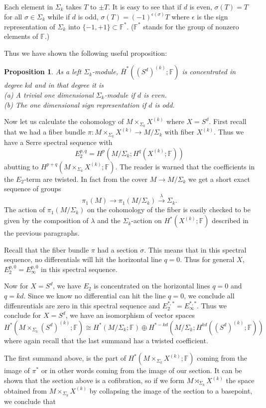 \documentclass{amsart}
\newtheorem{prop}[thm]{Proposition}
\newcommand{\FF}{\mathbb{F}}
\newcommand{\MsigX}{ M \times_{\Sigma_k} X^{(k)}}
\newcommand{\MtsigX}{ M \rtimes_{\Sigma_k} X^{(k)}}
\newcommand{\MsigSd}{ M \times_{\Sigma_k} (S^d)^{(k)}}
\begin{document}
Each element in $\Sigma_k$ takes $T$ to $ \pm T$. It is easy to 
see that if $d$ is even, $\sigma(T)=T$ for all $\sigma \in \Sigma_k$ 
while if $d$ is odd, $\sigma(T)=(-1)^{\epsilon(\sigma)}T$ 
where $\epsilon$ is the sign representation of $\Sigma_k$ into 
$\{-1,+1\} \subset \FF^*$. ($\FF^*$ stands for the group of nonzero 
elements of $\FF$.)

Thus we have shown the following useful proposition:

\begin{prop}
As a left $\Sigma_k$-module, 
$\bar{H}^*((S^d)^{(k)}; \FF)$ is concentrated in degree $kd$ and 
in that degree it is \\
(a) A trivial one dimensional $\Sigma_k$-module if $d$ is even. \\
(b) The one dimensional sign representation if $d$ is odd.  
\end{prop} 

Now let us calculate the cohomology of $\MsigX$ where $X=S^d$.
First recall that we had a fiber bundle 
$\pi: \MsigX \rightarrow M/\Sigma_k$ with fiber $X^{(k)}$. 
Thus we have a Serre spectral sequence with 
$$
E^{p,q}_2 = H^p(M/\Sigma_k; H^q(X^{(k)};\FF))
$$
abutting to $H^{p+q}(\MsigX; \FF)$.
The reader is warned that the coefficients in the $E_2$-term are twisted. 
In fact from the cover $M \rightarrow M/\Sigma_k$ we get a short exact 
sequence of groups 
$$
\pi_1(M) \rightarrow \pi_1(M/\Sigma_k) \overset{\lambda}{\rightarrow} 
\Sigma_k.
$$ 
The action of $\pi_1(M/\Sigma_k)$ on the cohomology of the fiber 
is easily checked to be given by 
the composition of $\lambda$ and the $\Sigma_k$-action on $H^*(X^{(k)}; \FF)$
described in the previous paragraphs.

Recall that the fiber bundle $\pi$ had a section $\sigma$. This means that in 
this spectral sequence, no differentials will hit the horizontal line 
$q=0$. Thus for general $X$, $E^{p,0}_2=E^{p,0}_{\infty}$ in this 
spectral sequence. 

Now for $X=S^d$, we have $E_2$ is concentrated on the horizontal lines 
$q=0$ and $q=kd$. Since we know no differential can hit the line $q=0$, 
we conclude all diffenrentials are zero in this spectral sequence 
and $E_2^{*,*}=E_{\infty}^{*,*}$. Thus we conclude for $X=S^d$, 
we have an isomorphism of vector spaces
$$
H^*(\MsigSd; \FF) \cong H^*(M/\Sigma_k; \FF) \oplus H^{*-kd}(M/\Sigma_k; 
H^{kd}((S^d)^{(k)}; \FF))
$$
where again recall that the last summand has a twisted coefficient.

The first summand above, is the part of $H^*(\MsigX; \FF)$ coming 
from the image of $\pi^*$ or in other words coming from the image of our 
section. It can be shown that the section above is a cofibration, so if 
we form $\MtsigX$ the space obtained from $\MsigX$ by collapsing the 
image of the section to a basepoint, we conclude that 
\end{document}
